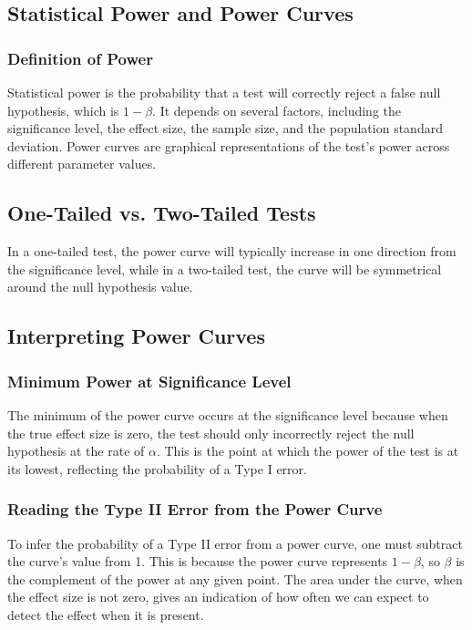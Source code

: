 \documentclass{article}
\begin{document}
\subsection{Statistical Power and Power Curves}
\subsubsection{Definition of Power}
Statistical power is the probability that a test will correctly reject a false null hypothesis, which is \(1 - \beta\). It depends on several factors, including the significance level, the effect size, the sample size, and the population standard deviation. Power curves are graphical representations of the test's power across different parameter values.

\subsection{One-Tailed vs. Two-Tailed Tests}
In a one-tailed test, the power curve will typically increase in one direction from the significance level, while in a two-tailed test, the curve will be symmetrical around the null hypothesis value.

\subsection{Interpreting Power Curves}
\subsubsection{Minimum Power at Significance Level}
The minimum of the power curve occurs at the significance level because when the true effect size is zero, the test should only incorrectly reject the null hypothesis at the rate of $\alpha$. This is the point at which the power of the test is at its lowest, reflecting the probability of a Type I error.

\subsubsection{Reading the Type II Error from the Power Curve}
To infer the probability of a Type II error from a power curve, one must subtract the curve's value from 1. This is because the power curve represents \(1 - \beta\), so \(\beta\) is the complement of the power at any given point. The area under the curve, when the effect size is not zero, gives an indication of how often we can expect to detect the effect when it is present.
\end{document}
